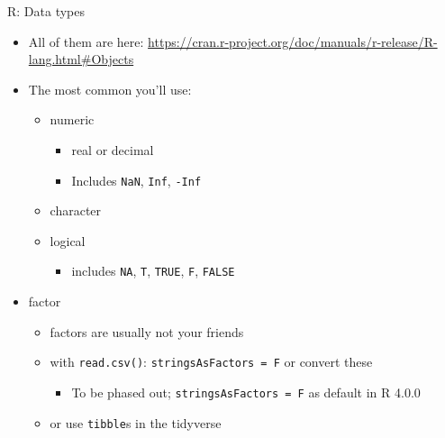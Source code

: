\documentclass[
  ignorenonframetext,
]{beamer}
\providecommand{\tightlist}{%
  \setlength{\itemsep}{0pt}\setlength{\parskip}{0pt}}
\begin{document}
\begin{frame}[fragile]{R: Data types}
\protect\hypertarget{r-data-types}{}

\begin{itemize}[<+->]
\tightlist
\item
  All of them are here:
  \url{https://cran.r-project.org/doc/manuals/r-release/R-lang.html\#Objects}
\item
  The most common you'll use:

  \begin{itemize}[<+->]
  \tightlist
  \item
    numeric

    \begin{itemize}[<+->]
    \tightlist
    \item
      real or decimal
    \item
      Includes \texttt{NaN}, \texttt{Inf}, \texttt{-Inf}
    \end{itemize}
  \item
    character
  \item
    logical

    \begin{itemize}[<+->]
    \tightlist
    \item
      includes \texttt{NA}, \texttt{T}, \texttt{TRUE}, \texttt{F},
      \texttt{FALSE}
    \end{itemize}
  \end{itemize}
\item
  factor

  \begin{itemize}[<+->]
  \tightlist
  \item
    factors are usually not your friends
  \item
    with \texttt{read.csv()}: \texttt{stringsAsFactors\ =\ F} or convert
    these

    \begin{itemize}[<+->]
    \tightlist
    \item
      To be phased out; \texttt{stringsAsFactors\ =\ F} as default in R
      4.0.0
    \end{itemize}
  \item
    or use \texttt{tibble}s in the tidyverse
  \end{itemize}
\end{itemize}

\end{frame}
\end{document}
